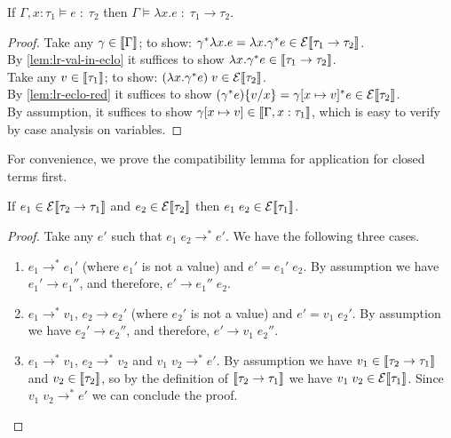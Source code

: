 \begin{lemma}
  If $\Gamma, x:\tau_1 \models e \;:\; \tau_2$
  then $\Gamma \models \lambda x.e \;:\; \tau_1 \to \tau_2$.
\end{lemma}
\begin{proof}
  Take any $\gamma \in \llbracket\Gamma\rrbracket$;
    to show: $\gamma^{*}\lambda x.e
      = \lambda x.\gamma^{*} e
      \in \mathcal{E}\llbracket\tau_1 \to \tau_2\rrbracket$.\\
  By \autoref{lem:lr-val-in-eclo} it suffices to show 
    $\lambda x.\gamma^{*} e
      \in \llbracket\tau_1 \to \tau_2\rrbracket$.\\
  Take any $v \in \llbracket\tau_1\rrbracket$;
    to show: $(\lambda x.\gamma^{*} e)\;v
      \in \mathcal{E}\llbracket\tau_2\rrbracket$. \\
  By \autoref{lem:lr-eclo-red} it suffices to show
    $(\gamma^{*} e)\{v/x\}
    = \gamma[x\mapsto v]^* e \in \mathcal{E}\llbracket\tau_2\rrbracket$. \\
  By assumption, it suffices to show
    $\gamma[x\mapsto v] \in \llbracket\Gamma, x : \tau_1\rrbracket$,
  which is easy to verify by case analysis on variables.
\end{proof}

For convenience, we prove the compatibility lemma for application
for closed terms first.

\begin{lemma}\label{lem:lr-compat-app-cl}
  If $e_1 \in \mathcal{E}\llbracket\tau_2 \to \tau_1\rrbracket$
  and $e_2 \in \mathcal{E}\llbracket\tau_2\rrbracket$
  then $e_1\;e_2 \in \mathcal{E}\llbracket\tau_1\rrbracket$.
\end{lemma}
\begin{proof}
  Take any $e'$ such that $e_1\;e_2 \longrightarrow^* e'$.
  We have the following three cases.
  \begin{enumerate}[label=(\roman*)]
  \item $e_1 \longrightarrow^* e_1'$
    (where $e_1'$ is not a value) and $e' = e_1'\;e_2$.
    By assumption we have $e_1' \longrightarrow e_1''$,
    and therefore, $e' \longrightarrow e_1''\;e_2$.
  \item $e_1 \longrightarrow^* v_1$, $e_2\longrightarrow e_2'$
    (where $e_2'$ is not a value) and $e' = v_1\;e_2'$.
    By assumption we have $e_2' \longrightarrow e_2''$,
    and therefore, $e' \longrightarrow v_1\;e_2''$.
  \item $e_1 \longrightarrow^* v_1$, $e_2 \longrightarrow^* v_2$
    and $v_1\;v_2 \longrightarrow^* e'$.
    By assumption we have $v_1\in\llbracket\tau_2\to\tau_1\rrbracket$
    and $v_2\in\llbracket\tau_2\rrbracket$,
    so by the definition of $\llbracket\tau_2\to\tau_1\rrbracket$
    we have $v_1\;v_2 \in \mathcal{E}\llbracket\tau_1\rrbracket$.
    Since $v_1\;v_2 \longrightarrow^* e'$ we can conclude the proof.
    \qedhere
  \end{enumerate}
\end{proof}

